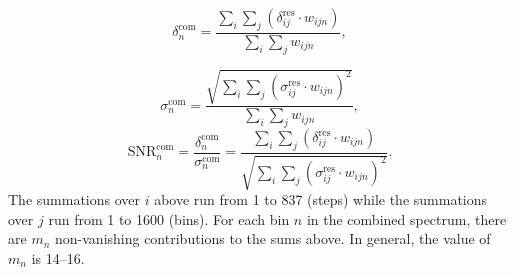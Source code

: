 \begin{equation}
    \label{eq:comb_power}
    \delta_{n}^\text{com} = \frac{\sum\limits_{i}\sum\limits_{j}\left(\delta_{ij}^\text{res} \cdot {w_{ijn}}\right)}{\sum\limits_{i}\sum\limits_{j} {w_{ijn}}},
\end{equation}

\begin{equation}
    \label{eq:comb_sigma}
    \sigma_{n}^\text{com} = \frac{ \sqrt{\sum\limits_{i}\sum\limits_{j}(\sigma_{ij}^\text{res} \cdot {w_{ijn}})^2}}{\sum\limits_{i}\sum\limits_{j} {w_{ijn}}},
\end{equation}
\begin{equation}
    \label{eq:comb_snr}
    \text{SNR}_{n}^\text{com} = \frac{\delta^\text{com}_{n}}{\sigma^\text{com}_{n}}= \frac{\sum\limits_{i}\sum\limits_{j}\left(\delta_{ij}^\text{res} \cdot {w_{ijn}}\right)}{ \sqrt{\sum\limits_{i}\sum\limits_{j}(\sigma_{ij}^\text{res} \cdot {w_{ijn}})^2}}.
\end{equation} 
The summations over $i$ above run from 1 to 837 (steps) while the summations 
over $j$ run from 1 to 1600 (bins).  
For each bin $n$ in the combined spectrum, there are $m_n$ non-vanishing 
contributions to the sums above. In general, the value of $m_n$ is 14--16.



